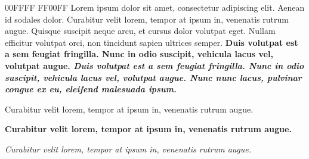  {00FFFF}
 {FF00FF}
\begindoc
    Lorem ipsum dolor sit amet, consectetur adipiscing elit. Aenean id sodales dolor.
    \linebreak
     {Curabitur velit lorem, tempor at ipsum in, venenatis rutrum augue.}
    \linebreak
    Quisque suscipit neque arcu, et cursus dolor volutpat eget. Nullam efficitur volutpat orci, non tincidunt sapien ultrices semper.
    \bf{Duis volutpat est a sem feugiat fringilla. Nunc in odio suscipit, vehicula lacus vel, volutpat augue.}
    \it{Duis volutpat est a sem feugiat fringilla. Nunc in odio suscipit, vehicula lacus vel, volutpat augue.}
    \linebreak
    \it{Nunc nunc lacus, pulvinar congue ex eu, eleifend malesuada ipsum.}
    \linebreak
    \beginenum
        \item Curabitur velit lorem, tempor at ipsum in, venenatis rutrum augue.
        \item \bf{ {Curabitur velit lorem, tempor at ipsum in, venenatis rutrum augue.}}
        \item \it{Curabitur velit lorem, tempor at ipsum in, venenatis rutrum augue.}
        \item \linebreak
    \endenum
    \linebreak
    \linebreak
\enddoc